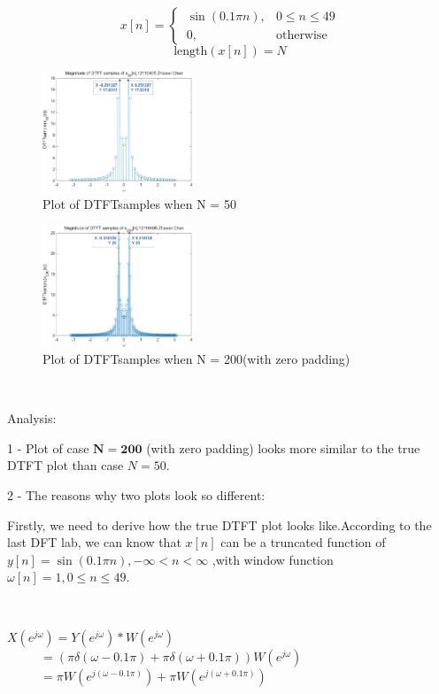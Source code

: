 \documentclass[journal]{IEEEtran}
\begin{document}
$$
x[n]=\begin{cases}
	\ \sin (0.1 \pi n), & 0 \leq n \leq 49\\
	\ 0, & \text{otherwise} 
\end{cases}
$$
$$
\text{length}(x[n])=N
$$
\begin{figure}[htbp]
   \centering  
   \includegraphics[width=0.4\textwidth]{523.png} %
\caption{Plot of DTFTsamples when N = 50}
   \label{fig:3}
 \end{figure}
\begin{figure}[htbp]
   \centering  
   \includegraphics[width=0.4\textwidth]{524.png} %
\caption{Plot of DTFTsamples when N = 200(with zero padding)}
   \label{fig:4}
 \end{figure}

 $~$

 \textcolor[rgb]{0,0.6,1}{Analysis:}

 \textcolor[rgb]{0,0.6,1}{1 -} Plot of case $\mathbf{N=200}$ (with zero padding) looks more similar to the true DTFT plot than case $N=50$.

 \textcolor[rgb]{0,0.6,1}{2 -} The reasons why two plots look so different:

Firstly, we need to derive how the true DTFT plot looks like.According to the last DFT lab, we can know that $x[n]$ can be a truncated function of $y[n]=\sin (0.1\pi n), -\infty<n<\infty$ 
,with window function $\omega[n]=1, 0 \leq n \leq 49$.

$~$

\(\displaystyle X(e^{j\omega})=Y(e^{j\omega})*W(e^{j\omega})\)\\
\(\displaystyle ~~~~~~~~~~~~=(\pi\delta(\omega-0.1\pi)+\pi\delta(\omega+0.1\pi))W(e^{j\omega})\)\\
\(\displaystyle  ~~~~~~~~~~~~=\pi W(e^{j(\omega-0.1\pi)})+\pi W(e^{j(\omega+0.1\pi)})\)
\end{document}
